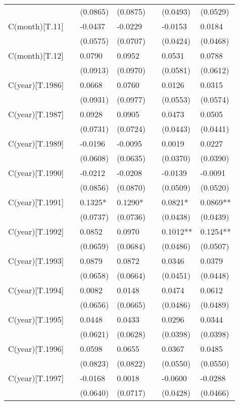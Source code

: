 \begin{tabular}{lllllll}
 &  & (0.0865) & (0.0875) &  & (0.0493) & (0.0529) \\
C(month)[T.11] &  & -0.0437 & -0.0229 &  & -0.0153 & 0.0184 \\
 &  & (0.0575) & (0.0707) &  & (0.0424) & (0.0468) \\
C(month)[T.12] &  & 0.0790 & 0.0952 &  & 0.0531 & 0.0788 \\
 &  & (0.0913) & (0.0970) &  & (0.0581) & (0.0612) \\
C(year)[T.1986] &  & 0.0668 & 0.0760 &  & 0.0126 & 0.0315 \\
 &  & (0.0931) & (0.0977) &  & (0.0553) & (0.0574) \\
C(year)[T.1987] &  & 0.0928 & 0.0905 &  & 0.0473 & 0.0505 \\
 &  & (0.0731) & (0.0724) &  & (0.0443) & (0.0441) \\
C(year)[T.1989] &  & -0.0196 & -0.0095 &  & 0.0019 & 0.0227 \\
 &  & (0.0608) & (0.0635) &  & (0.0370) & (0.0390) \\
C(year)[T.1990] &  & -0.0212 & -0.0208 &  & -0.0139 & -0.0091 \\
 &  & (0.0856) & (0.0870) &  & (0.0509) & (0.0520) \\
C(year)[T.1991] &  & 0.1325* & 0.1290* &  & 0.0821* & 0.0869** \\
 &  & (0.0737) & (0.0736) &  & (0.0438) & (0.0439) \\
C(year)[T.1992] &  & 0.0852 & 0.0970 &  & 0.1012** & 0.1254** \\
 &  & (0.0659) & (0.0684) &  & (0.0486) & (0.0507) \\
C(year)[T.1993] &  & 0.0879 & 0.0872 &  & 0.0346 & 0.0379 \\
 &  & (0.0658) & (0.0664) &  & (0.0451) & (0.0448) \\
C(year)[T.1994] &  & 0.0082 & 0.0148 &  & 0.0474 & 0.0612 \\
 &  & (0.0656) & (0.0665) &  & (0.0486) & (0.0489) \\
C(year)[T.1995] &  & 0.0448 & 0.0433 &  & 0.0296 & 0.0344 \\
 &  & (0.0621) & (0.0628) &  & (0.0398) & (0.0398) \\
C(year)[T.1996] &  & 0.0598 & 0.0655 &  & 0.0367 & 0.0485 \\
 &  & (0.0823) & (0.0822) &  & (0.0550) & (0.0550) \\
C(year)[T.1997] &  & -0.0168 & 0.0018 &  & -0.0600 & -0.0288 \\
 &  & (0.0640) & (0.0717) &  & (0.0428) & (0.0466) \\

\end{tabular}
